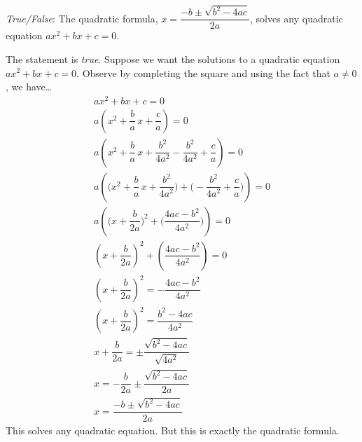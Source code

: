 \documentclass[11pt,letterpaper]{article}
\begin{document}
\quizsol \textit{True/False}: The quadratic formula, $x= \dfrac{-b \pm \sqrt{b^2 - 4ac}}{2a}$, solves any quadratic equation $ax^2 + bx + c= 0$. \pspace

\sol The statement is \textit{true}. Suppose we want the solutions to a quadratic equation $ax^2 + bx + c= 0$. Observe by completing the square and using the fact that $a \neq 0$, we have\dots
	\[
	\begin{gathered}
	ax^2 + bx + c= 0 \\
	a \left(x^2 + \dfrac{b}{a}\, x + \dfrac{c}{a} \right)= 0 \\
	a \left(x^2 + \dfrac{b}{a}\, x + \dfrac{b^2}{4a^2} - \dfrac{b^2}{4a^2} + \dfrac{c}{a} \right)= 0 \\
	a \left( \bigg( x^2 + \dfrac{b}{a}\, x + \dfrac{b^2}{4a^2} \bigg) + \bigg( -\dfrac{b^2}{4a^2} + \dfrac{c}{a} \bigg) \right)= 0 \\
	a \left( \bigg(x + \dfrac{b}{2a} \bigg)^2 + \bigg( \dfrac{4ac - b^2}{4a^2} \bigg) \right)= 0 \\
	\left( x + \dfrac{b}{2a} \right)^2 + \left( \dfrac{4ac - b^2}{4a^2} \right)= 0 \\
	\left( x + \dfrac{b}{2a} \right)^2 = - \dfrac{4ac - b^2}{4a^2} \\
	\left( x + \dfrac{b}{2a} \right)^2 = \dfrac{b^2 - 4ac}{4a^2} \\
	x + \dfrac{b}{2a}= \pm \dfrac{\sqrt{b^2 - 4ac}}{\sqrt{4a^2}} \\
	x= -\dfrac{b}{2a} \pm \dfrac{\sqrt{b^2 - 4ac}}{2a} \\
	x= \dfrac{-b \pm \sqrt{b^2 - 4ac}}{2a}
	\end{gathered}
	\]
This solves any quadratic equation. But this is exactly the quadratic formula. 
	
\end{document}
